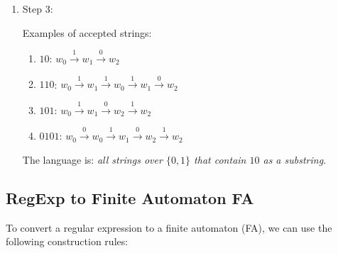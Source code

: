 \documentclass[12pt,a4paper,openany]{article}
\begin{document}
\begin{enumerate}
Then, the path from $w_0$ to $w_2$ is:

\[
R_{w_0,w_2} = 1(10^*1)^*0
\]

We can loop at $w_0$ using $(0 + 1(10^*1)^*1)^*$, then go to $w_2$ and loop there using $(1 + 0(10^*1)^*0)^*$.
The final regular expression for strings accepted by this DFA is:

\[
\boxed{R = (0 + 1(10^*1)^*1)^* \cdot 1(10^*1)^*0 \cdot (1 + 0(10^*1)^*0)^*}
\]

\item Step 3:

Examples of accepted strings:

\begin{enumerate}
    \item $10$: $w_0 \xrightarrow{1} w_1 \xrightarrow{0} w_2$ 
    \item $110$: $w_0 \xrightarrow{1} w_1 \xrightarrow{1} w_0 \xrightarrow{1} w_1 \xrightarrow{0} w_2$ 
    \item $101$: $w_0 \xrightarrow{1} w_1 \xrightarrow{0} w_2 \xrightarrow{1} w_2$ 
    \item $0101$: $w_0 \xrightarrow{0} w_0 \xrightarrow{1} w_1 \xrightarrow{0} w_2 \xrightarrow{1} w_2$ 
\end{enumerate}

The language is: \emph{all strings over $\{0,1\}$ that contain $10$ as a substring}.

\end{enumerate}

\subsection{RegExp to Finite Automaton FA}

To convert a regular expression to a finite automaton (FA), we can use the following construction rules:
\end{document}
